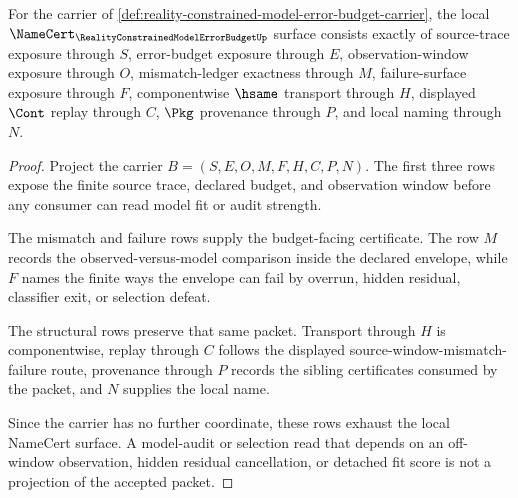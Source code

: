 \begin{theorem}
\label{thm:reality-constrained-model-error-budget-namecert-obligations}
For the carrier of \autoref{def:reality-constrained-model-error-budget-carrier}, the local $\NameCert_{\RealityConstrainedModelErrorBudgetUp}$ surface consists exactly of source-trace exposure through $S$, error-budget exposure through $E$, observation-window exposure through $O$, mismatch-ledger exactness through $M$, failure-surface exposure through $F$, componentwise $\hsame$ transport through $H$, displayed $\Cont$ replay through $C$, $\Pkg$ provenance through $P$, and local naming through $N$.
\end{theorem}
\begin{proof}
Project the carrier $B=(S,E,O,M,F,H,C,P,N)$. The first three rows expose the finite source trace, declared budget, and observation window before any consumer can read model fit or audit strength.

The mismatch and failure rows supply the budget-facing certificate. The row $M$ records the observed-versus-model comparison inside the declared envelope, while $F$ names the finite ways the envelope can fail by overrun, hidden residual, classifier exit, or selection defeat.

The structural rows preserve that same packet. Transport through $H$ is componentwise, replay through $C$ follows the displayed source-window-mismatch-failure route, provenance through $P$ records the sibling certificates consumed by the packet, and $N$ supplies the local name.

Since the carrier has no further coordinate, these rows exhaust the local NameCert surface. A model-audit or selection read that depends on an off-window observation, hidden residual cancellation, or detached fit score is not a projection of the accepted packet.
\end{proof}

